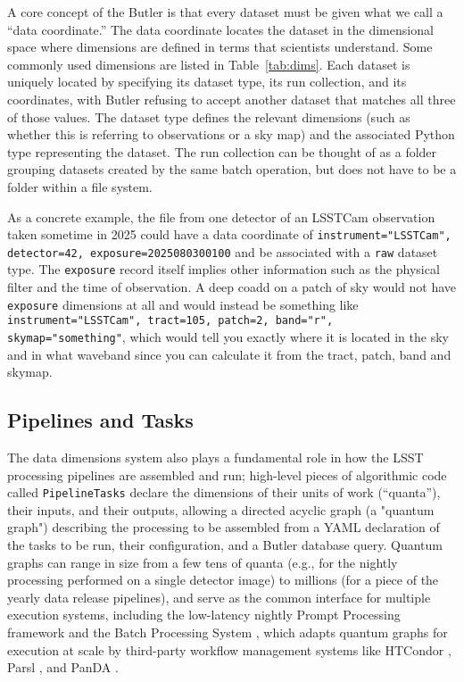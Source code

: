 A core concept of the Butler is that every dataset must be given what we call a ``data coordinate.''
The data coordinate locates the dataset in the dimensional space where dimensions are defined in terms that scientists understand.
Some commonly used dimensions are listed in Table~\ref{tab:dims}.
Each dataset is uniquely located by specifying its dataset type, its run collection, and its coordinates, with Butler refusing to accept another dataset that matches all three of those values.
The dataset type defines the relevant dimensions (such as whether this is referring to observations or a sky map) and the associated Python type representing the dataset.
The run collection can be thought of as a folder grouping datasets created by the same batch operation, but does not have to be a folder within a file system.

As a concrete example, the file from one detector of an LSSTCam observation taken sometime in 2025 could have a data coordinate of \texttt{instrument="LSSTCam", detector=42, exposure=2025080300100} and be associated with a \texttt{raw} dataset type.
The \texttt{exposure} record itself implies other information such as the physical filter and the time of observation.
A deep coadd on a patch of sky would not have \texttt{exposure} dimensions at all and would instead be something like \texttt{instrument="LSSTCam", tract=105, patch=2, band="r", skymap="something"}, which would tell you exactly where it is located in the sky and in what waveband since you can calculate it from the tract, patch, band and skymap.

\subsection{Pipelines and Tasks}

The data dimensions system also plays a fundamental role in how the LSST processing pipelines are assembled and run; high-level pieces of algorithmic code called \texttt{PipelineTasks} declare the dimensions of their units of work (``quanta''), their inputs, and their outputs, allowing a directed acyclic graph (a "quantum graph") describing the processing to be assembled from a YAML declaration of the tasks to be run, their configuration, and a Butler database query.
Quantum graphs can range in size from a few tens of quanta (e.g., for the nightly processing performed on a single detector image) to millions (for a piece of the yearly data release pipelines), and serve as the common interface for multiple execution systems, including the low-latency nightly Prompt Processing framework \citep{DMTN-219} and the Batch Processing System \citep[BPS;][]{2022arXiv221115795G}, which adapts quantum graphs for execution at scale by third-party workflow management systems like HTCondor \citep{2022zndo...2579447H}, Parsl \citep{10.1145/3307681.3325400}, and PanDA \citep{2024EPJWC.29504026K}.

